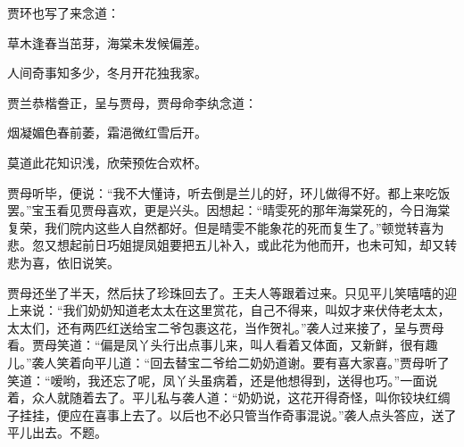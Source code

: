 \begin{parag}
    贾环也写了来念道：
\end{parag}

\begin{poem}
    \begin{pl}
        草木逢春当茁芽，海棠未发候偏差。
    \end{pl}


    \begin{pl}
        人间奇事知多少，冬月开花独我家。
    \end{pl}
\end{poem}


\begin{parag}
    贾兰恭楷誊正，呈与贾母，贾母命李纨念道：
\end{parag}


\begin{poem}


    \begin{pl}
        烟凝媚色春前萎，霜浥微红雪后开。
    \end{pl}


    \begin{pl}
        莫道此花知识浅，欣荣预佐合欢杯。
    \end{pl}

\end{poem}

\begin{parag}
    贾母听毕，便说：“我不大懂诗，听去倒是兰儿的好，环儿做得不好。都上来吃饭罢。”宝玉看见贾母喜欢，更是兴头。因想起：“晴雯死的那年海棠死的，今日海棠复荣，我们院内这些人自然都好。但是晴雯不能象花的死而复生了。”顿觉转喜为悲。忽又想起前日巧姐提凤姐要把五儿补入，或此花为他而开，也未可知，却又转悲为喜，依旧说笑。
\end{parag}


\begin{parag}
    贾母还坐了半天，然后扶了珍珠回去了。王夫人等跟着过来。只见平儿笑嘻嘻的迎上来说：“我们奶奶知道老太太在这里赏花，自己不得来，叫奴才来伏侍老太太，太太们，还有两匹红送给宝二爷包裹这花，当作贺礼。”袭人过来接了，呈与贾母看。贾母笑道：“偏是凤丫头行出点事儿来，叫人看着又体面，又新鲜，很有趣儿。”袭人笑着向平儿道：“回去替宝二爷给二奶奶道谢。要有喜大家喜。”贾母听了笑道：“嗳哟，我还忘了呢，凤丫头虽病着，还是他想得到，送得也巧。”一面说着，众人就随着去了。平儿私与袭人道：“奶奶说，这花开得奇怪，叫你铰块红绸子挂挂，便应在喜事上去了。以后也不必只管当作奇事混说。”袭人点头答应，送了平儿出去。不题。
\end{parag}


